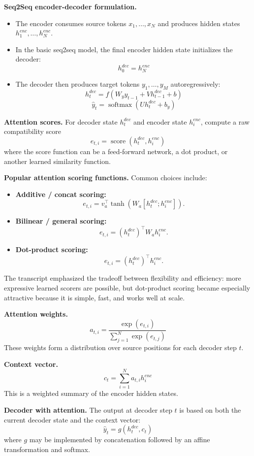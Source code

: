 \documentclass[11pt]{article}
\begin{document}
\textbf{Seq2Seq encoder-decoder formulation.}
\begin{itemize}
    \item The encoder consumes source tokens \(x_1,\dots,x_N\) and produces hidden states \(h^{enc}_1,\dots,h^{enc}_N\).
    \item In the basic seq2seq model, the final encoder hidden state initializes the decoder:
    \[
    h^{dec}_0 = h^{enc}_N
    \]
    \item The decoder then produces target tokens \(y_1,\dots,y_M\) autoregressively:
    \[
    h^{dec}_t = f(W_y y_{t-1} + V h^{dec}_{t-1} + b)
    \]
    \[
    \hat{y}_t = \operatorname{softmax}(U h^{dec}_t + b_y)
    \]
\end{itemize}

\textbf{Attention scores.} For decoder state \(h^{dec}_t\) and encoder state \(h^{enc}_i\), compute a raw compatibility score
\[
e_{t,i} = \operatorname{score}(h^{dec}_t, h^{enc}_i)
\]
where the score function can be a feed-forward network, a dot product, or another learned similarity function.

\textbf{Popular attention scoring functions.} Common choices include:
\begin{itemize}
    \item \textbf{Additive / concat scoring:}
    \[
    e_{t,i} = v_a^\top \tanh\!\left(W_a [h^{dec}_t; h^{enc}_i]\right).
    \]
    \item \textbf{Bilinear / general scoring:}
    \[
    e_{t,i} = (h^{dec}_t)^\top W_a h^{enc}_i.
    \]
    \item \textbf{Dot-product scoring:}
    \[
    e_{t,i} = (h^{dec}_t)^\top h^{enc}_i.
    \]
\end{itemize}
The transcript emphasized the tradeoff between flexibility and efficiency: more expressive learned scorers are possible, but dot-product scoring became especially attractive because it is simple, fast, and works well at scale.

\textbf{Attention weights.}
\[
a_{t,i} = \frac{\exp(e_{t,i})}{\sum_{j=1}^{N}\exp(e_{t,j})}
\]
These weights form a distribution over source positions for each decoder step \(t\).

\textbf{Context vector.}
\[
c_t = \sum_{i=1}^{N} a_{t,i} h^{enc}_i
\]
This is a weighted summary of the encoder hidden states.

\textbf{Decoder with attention.} The output at decoder step \(t\) is based on both the current decoder state and the context vector:
\[
\hat{y}_t = g(h^{dec}_t, c_t)
\]
where \(g\) may be implemented by concatenation followed by an affine transformation and softmax.
\end{document}

